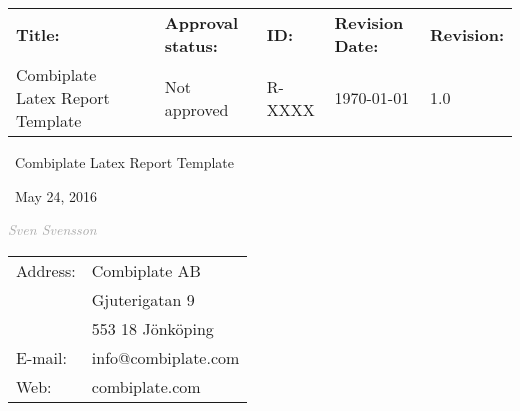 \documentclass[]{report}
\newcommand{\code}[2][Black]{\textcolor{#1}{\textit{#2}}}
\begin{document}
\begin{titlepage}
	\raggedright
	
	\footnotesize
	\begin{tabularx}{\textwidth}{l X l l l l }
		\textbf{Title:} & & \textbf{Approval status:} & \textbf{ID:} & \textbf{Revision Date:} & \textbf{Revision:}\\
		Combiplate Latex Report Template & & Not approved & R-XXXX & \today & 1.0
	\end{tabularx}
	
	
	\null\vspace{4cm}
	\noindent\hrulefill\par
	{\Huge\ Combiplate Latex Report Template\par}
	\noindent\hrulefill\par
	
	{\Large\ May 24, 2016\par}
	
	\vspace{0.5 cm}
	{\Large\code[darkgray]{Sven Svensson}}
	

	\vfill
	\hspace{9.5cm}
	\footnotesize
	\begin{tabular}{ l l }
		Address: & Combiplate AB \\ 
		& Gjuterigatan 9 \\  
		& 553 18 Jönköping \\
		E-mail: & info@combiplate.com \\
		Web: & combiplate.com	     
	\end{tabular}

\end{titlepage}
\end{document}
